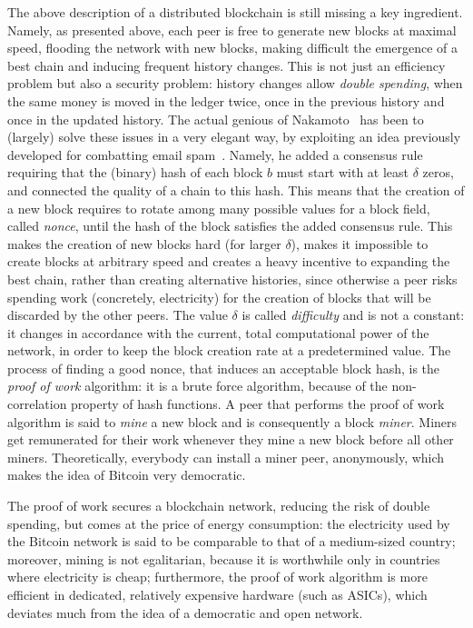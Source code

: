 The above description of a distributed blockchain is still missing a key ingredient. Namely,
as presented above, each peer is free to generate new blocks at maximal speed, flooding the network
with new blocks, making difficult the emergence of a best chain and inducing frequent history changes.
This is not just an efficiency problem but also a security problem: history changes allow
\emph{double spending}, when the same money is moved in the ledger twice, once in the previous history
and once in the updated history. The actual genious of Nakamoto~\cite{Nakamoto08} has been to (largely)
solve these issues in a very elegant way, by exploiting an idea previously developed for combatting
email spam~\cite{DworkN92}. Namely, he added a consensus rule requiring that the (binary)
hash of each block $b$ must start with at least $\delta$ zeros, and connected the quality of a chain
to this hash. This means that the creation of a new block requires to rotate among
many possible values for a block field, called \emph{nonce}, until the hash of the block satisfies the
added consensus rule. This makes the creation of new blocks hard
(for larger $\delta$), makes it impossible to create blocks at arbitrary speed and creates a heavy
incentive to expanding the best chain, rather than creating alternative histories, since otherwise a peer
risks spending work (concretely, electricity) for the creation of blocks that will be discarded by the other peers.
The value $\delta$ is called \emph{difficulty} and is not a constant: it changes in accordance with
the current, total computational power of the network, in order to keep the block creation rate at a predetermined value.
The process of finding a good nonce, that induces an
acceptable block hash, is the \emph{proof of work} algorithm: it is a brute force algorithm, because of the non-correlation
property of hash functions. A peer that performs the proof of work algorithm is said to \emph{mine}
a new block and is consequently a block \emph{miner}. Miners get remunerated for their work whenever
they mine a new block before all other miners. Theoretically, everybody can install a miner peer,
anonymously, which makes the idea of Bitcoin very democratic.

The proof of work secures a blockchain network, reducing the risk of double spending,
but comes at the price of energy consumption: the electricity used by the Bitcoin network is said
to be comparable to that of a medium-sized country; moreover, mining is not egalitarian, because
it is worthwhile only in countries where electricity is cheap; furthermore, the proof of work algorithm
is more efficient in dedicated, relatively expensive hardware (such as ASICs),
which deviates much from the idea of a democratic and open network.
